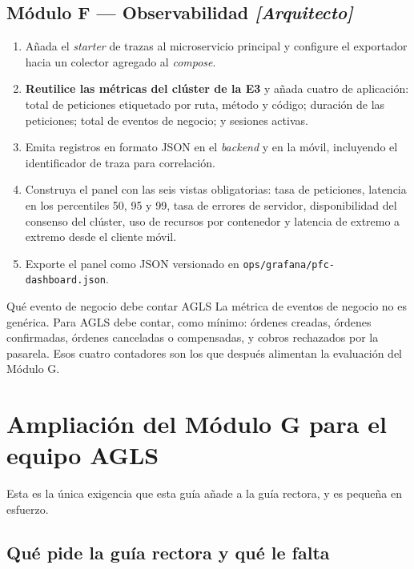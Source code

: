 \documentclass[11pt,a4paper]{article}
\begin{document}
\subsection{Módulo F --- Observabilidad \emph{[Arquitecto]}}

\begin{enumerate}[leftmargin=*,itemsep=3pt]
	\item Añada el \emph{starter} de trazas al microservicio principal y configure el exportador hacia un colector agregado al \emph{compose}.
	\item \textbf{Reutilice las métricas del clúster de la E3} y añada cuatro de aplicación: total de peticiones etiquetado por ruta, método y código; duración de las peticiones; total de eventos de negocio; y sesiones activas.
	\item Emita registros en formato JSON en el \emph{backend} y en la móvil, incluyendo el identificador de traza para correlación.
	\item Construya el panel con las seis vistas obligatorias: tasa de peticiones, latencia en los percentiles 50, 95 y 99, tasa de errores de servidor, disponibilidad del consenso del clúster, uso de recursos por contenedor y latencia de extremo a extremo desde el cliente móvil.
	\item Exporte el panel como JSON versionado en \texttt{ops/grafana/\allowbreak pfc-dashboard.json}.
\end{enumerate}

\begin{defBox}{Qué evento de negocio debe contar AGLS}
	La métrica de eventos de negocio no es genérica. Para AGLS debe contar, como mínimo: órdenes creadas, órdenes confirmadas, órdenes canceladas o compensadas, y cobros rechazados por la pasarela. Esos cuatro contadores son los que después alimentan la evaluación del Módulo G.
\end{defBox}

\section{Ampliación del Módulo G para el equipo AGLS}

Esta es la única exigencia que esta guía añade a la guía rectora, y es pequeña en esfuerzo.

\subsection{Qué pide la guía rectora y qué le falta}
\end{document}
